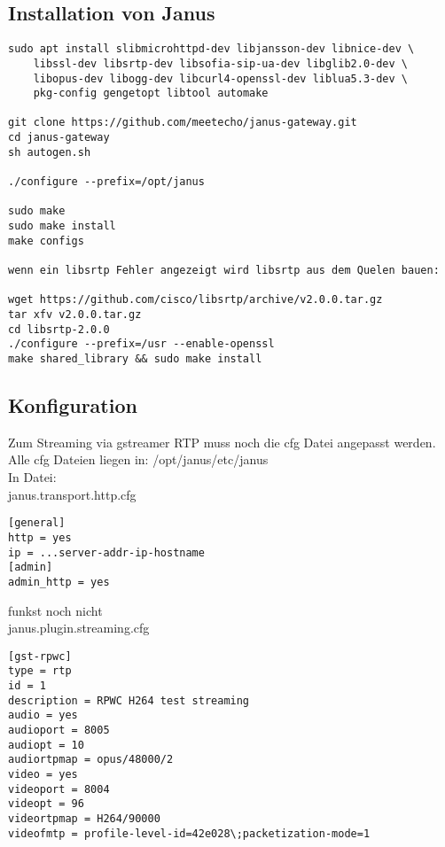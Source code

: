 \subsection{Installation von Janus}
\begin{verbatim}
sudo apt install slibmicrohttpd-dev libjansson-dev libnice-dev \
	libssl-dev libsrtp-dev libsofia-sip-ua-dev libglib2.0-dev \
	libopus-dev libogg-dev libcurl4-openssl-dev liblua5.3-dev \
	pkg-config gengetopt libtool automake

git clone https://github.com/meetecho/janus-gateway.git
cd janus-gateway
sh autogen.sh

./configure --prefix=/opt/janus

sudo make 
sudo make install 
make configs

wenn ein libsrtp Fehler angezeigt wird libsrtp aus dem Quelen bauen:

wget https://github.com/cisco/libsrtp/archive/v2.0.0.tar.gz
tar xfv v2.0.0.tar.gz
cd libsrtp-2.0.0
./configure --prefix=/usr --enable-openssl
make shared_library && sudo make install
\end{verbatim}

\subsection{Konfiguration}
Zum Streaming via gstreamer RTP muss noch die cfg Datei angepasst werden.\\
Alle cfg Dateien liegen in: /opt/janus/etc/janus\\

In Datei:\\
janus.transport.http.cfg
\begin{verbatim}
[general]
http = yes
ip = ...server-addr-ip-hostname
[admin]
admin_http = yes
\end{verbatim}

funkst noch nicht\\
janus.plugin.streaming.cfg
\begin{verbatim}
[gst-rpwc]
type = rtp 
id = 1 
description = RPWC H264 test streaming 
audio = yes 
audioport = 8005 
audiopt = 10 
audiortpmap = opus/48000/2 
video = yes 
videoport = 8004 
videopt = 96 
videortpmap = H264/90000 
videofmtp = profile-level-id=42e028\;packetization-mode=1 
\end{verbatim}

